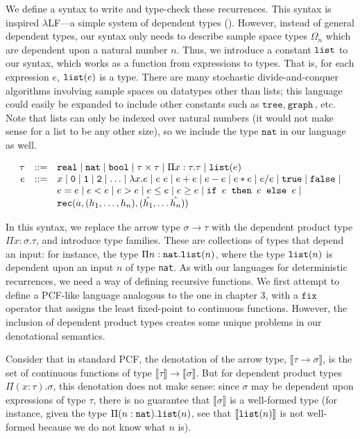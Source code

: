 We define a syntax to write and type-check these recurrences. This syntax is inspired $\lambda$LF---a simple system of 
dependent types (\cite{Pierce:2005aa}). However, instead of general dependent types, our syntax only needs to
describe sample space types $\Omega_n$ which are dependent upon a natural number $n$. Thus, we introduce
a constant $\texttt{list}$ to our syntax, which works as a function from expressions to types. That is, for each 
expression $e$, $\texttt{list}(e)$ is a type. There are many stochastic divide-and-conquer algorithms involving sample spaces
on datatypes other than lists; this language could easily be expanded to include other constants such as
 $\texttt{tree}, \ \texttt{graph}$, etc. Note that lists can only be indexed over natural numbers (it would not make 
 sense for a list to be any other size), so we include the type $\texttt{nat}$ in our language as well.
 
 \[
\begin{array}{rcl}
\tau &::=& \texttt{real} \mid \texttt{nat} \mid \texttt{bool} \mid \tau \times \tau \mid \Pi x:\tau.\tau
\mid \texttt{list}(e) \\
e &::=& x  \mid \texttt{0} \mid \texttt{1} \mid \texttt{2} \mid \dotsc \mid \lambda x.e \mid e \ e \mid e + e \mid e - e \mid  e  *  e \mid e / e \mid \texttt{true} \mid \texttt{false} \mid \\
  && e  =  e \mid e < e \mid e > e \mid e \leq e \mid e \geq e \mid 
     \texttt{if } e \texttt{ then } e \texttt{ else } e \mid \\
     && \texttt{rec}(a, (h_1, \ldots, h_n), (\hat{h_1}, \ldots \hat{h_n})) 
\end{array}
\]

In this syntax, we replace the arrow type $\sigma \rightarrow \tau$ with the dependent product type
$\Pi x:\sigma.\tau$, and introduce type families. 
These are collections of types that depend an input: for instance,
the type $\Pi n:\texttt{nat}.\texttt{list}(n)$, where the type $\texttt{list}(n)$ is dependent upon an input $n$ of type \texttt{nat}.
As with our languages for deterministic recurrences, we need a way of defining recursive functions. We first attempt
to define a PCF-like language analogous to the one in chapter 3, with a $\texttt{fix}$ operator that assigns the least
fixed-point to continuous functions. However, the inclusion of dependent product types creates some unique problems
in our denotational semantics.

Consider that in standard PCF, the denotation of the arrow type, $\llbracket \tau \rightarrow \sigma \rrbracket$, is the
set of continuous functions of type
$\llbracket \tau \rrbracket \rightarrow \llbracket \sigma \rrbracket$. But for dependent product types $\Pi(x:\tau).\sigma$,
this denotation does not make sense: 
since $\sigma$ may be dependent upon expressions of type $\tau$, there is no guarantee
that $\llbracket \sigma \rrbracket$ is a well-formed type (for instance, given the type $\Pi(n:\texttt{nat}).\texttt{list}(n)$, see that
$\llbracket \texttt{list}(n) \rrbracket$ is not well-formed because we do not know what $n$ is).

